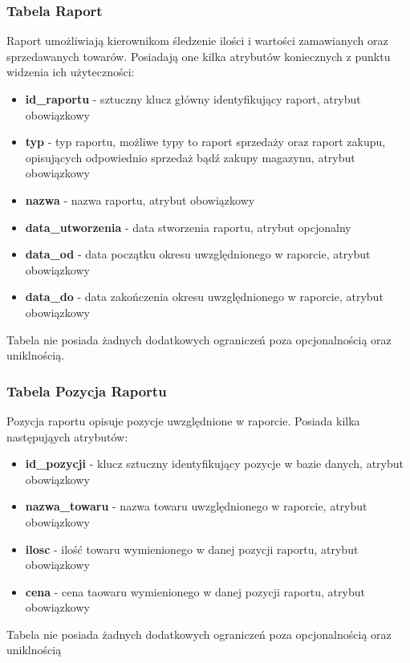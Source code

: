 \subsubsection{Tabela Raport}
Raport umożliwiają kierownikom śledzenie ilości i wartości zamawianych oraz
sprzedawanych towarów. Posiadają one kilka atrybutów koniecznych z punktu
widzenia ich użyteczności:
\begin{itemize}
  \item \textbf{id\_raportu} - sztuczny klucz główny identyfikujący raport,
  atrybut obowiązkowy
  \item \textbf{typ} - typ raportu, możliwe typy to raport sprzedaży oraz raport
  zakupu, opisujących odpowiednio sprzedaż bądź zakupy magazynu, atrybut
  obowiązkowy
  \item \textbf{nazwa} - nazwa raportu, atrybut obowiązkowy
  \item \textbf{data\_utworzenia} - data stworzenia raportu, atrybut opcjonalny
  \item \textbf{data\_od} - data początku okresu uwzględnionego w raporcie,
  atrybut obowiązkowy
  \item \textbf{data\_do} - data zakończenia okresu uwzględnionego w raporcie,
  atrybut obowiązkowy
\end{itemize}

Tabela nie posiada żadnych dodatkowych ograniczeń poza opcjonalnością oraz
uniklnością.

\subsubsection{Tabela Pozycja Raportu}
Pozycja raportu opisuje pozycje uwzględnione w raporcie. Posiada kilka
następująych atrybutów:
\begin{itemize}
  \item \textbf{id\_pozycji} - klucz sztuczny identyfikujący pozycje w bazie
  danych, atrybut obowiązkowy
  \item \textbf{nazwa\_towaru} - nazwa towaru uwzględnionego w raporcie, atrybut
  obowiązkowy
  \item \textbf{ilosc} - ilość towaru wymienionego w danej pozycji raportu,
  atrybut obowiązkowy
  \item \textbf{cena} - cena taowaru wymienionego w danej pozycji raportu,
  atrybut obowiązkowy
\end{itemize}

Tabela nie posiada żadnych dodatkowych ograniczeń poza opcjonalnością oraz
uniklnością
